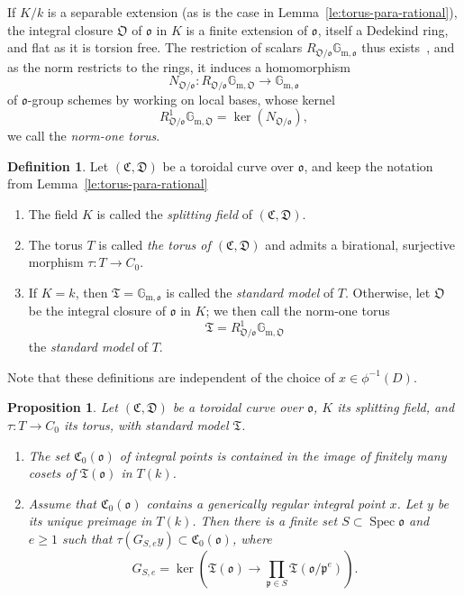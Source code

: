 \documentclass[a4paper, twoside, 11pt]{amsart}
\newtheorem{proposition}[theorem]{Proposition}
\theoremstyle{definition}
\newtheorem{definition}[theorem]{Definition}
\newcommand{\mC}{\mathfrak{C}}
\newcommand{\mD}{\mathfrak{D}}
\newcommand{\mT}{\mathfrak{T}}
\newcommand{\fo}{\mathfrak{o}}
\newcommand{\fO}{\mathfrak{O}}
\newcommand{\fp}{\mathfrak{p}}
\newcommand{\Gmok}{\mathbb{G}_{\mathrm{m},\mathfrak{o}}}
\newcommand{\GmO}{\mathbb{G}_{\mathrm{m},\mathfrak{O}}}
\DeclareMathOperator{\Spec}{Spec}
\begin{document}
If $K/k$ is a separable extension (as is the case in Lemma~\ref{le:torus-para-rational}), the integral closure $\fO$ of $\fo$ in $K$ is a finite extension of $\fo$, itself a Dedekind ring, and flat as it is torsion free. The restriction of scalars $R_{\fO / \fo}\Gmok$ thus exists~\cite[\S\,7.6~Thm.~4]{MR1045822}, and as the norm restricts to the rings, it induces a homomorphism
\begin{equation*}
	N_{\fO/\fo}\colon R_{\fO / \fo}\GmO \to \Gmok
\end{equation*}
of $\fo$-group schemes by working on local bases, whose kernel
\begin{equation*}
	R^1_{\fO / \fo}\GmO = \ker (N_{\fO/\fo}),
\end{equation*}
we call the \emph{norm-one torus}.

\begin{definition}
	Let $(\mC,\mD)$ be a toroidal curve over $\fo$, and
    keep the notation from Lemma~\ref{le:torus-para-rational}
	\begin{enumerate}
		\item The field $K$ is called the \emph{splitting field} of $(\mC,\mD)$.
		\item The torus $T$ is called \emph{the torus of $(\mC,\mD)$} and admits a birational, surjective morphism $\tau \colon T\to C_0$. 
		\item If $K=k$, then $\mT = \Gmok$ is called the \emph{standard model} of $T$. Otherwise, let $\fO$ be the integral closure of $\fo$ in $K$; we then call the norm-one torus
		\begin{equation*}
			\mT=R^1_{\fO / \fo}\GmO
		\end{equation*}
		the \emph{standard model} of $T$.
	\end{enumerate}
	Note that these definitions are independent of the choice of $x\in \phi^{-1}(D)$.
\end{definition}


\begin{proposition}\label{prop:torus-para-integral}
Let $(\mC,\mD)$ be a toroidal curve over $\fo$, $K$ its splitting field, and $\tau\colon T\to C_0$ its torus, with standard model $\mT$.
\begin{enumerate}
	\item The set $\mC_0(\fo)$ of integral points is contained in the image of finitely many cosets of $\mT(\fo)$ in $T(k)$.
	\item Assume that $\mC_0(\fo)$ contains a generically regular integral point $x$. Let $y$ be its unique preimage in $T(k)$. Then there is a finite set $S\subset \Spec \fo$ and $e\ge 1$ such that $\tau(G_{S,e}y)\subset \mC_0(\fo)$, where
	\begin{equation*}
		G_{S,e} = \ker\left(\mT(\fo) \to \prod_{\fp\in S} \mT(\fo/\fp^e)\right).
	\end{equation*}
\end{enumerate}
\end{proposition}
\end{document}
